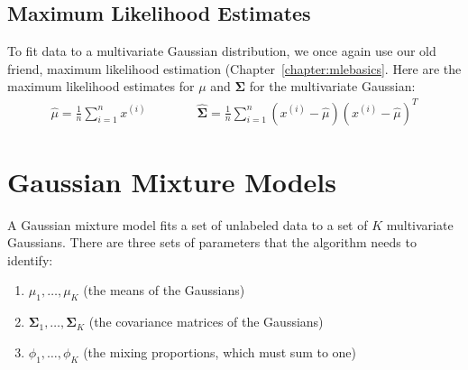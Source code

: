 \subsection{Maximum Likelihood Estimates}

To fit data to a multivariate Gaussian distribution, we once again use our old friend, maximum likelihood estimation (Chapter~\ref{chapter:mlebasics}. Here are the maximum likelihood estimates for $\mu$ and $\boldsymbol{\Sigma}$ for the multivariate Gaussian:
\begin{align*} {\hat{\mu} = \frac{1}{n} \sum_{i=1}^n x^{(i)}} \qquad\qquad \hat{\boldsymbol\Sigma} = \frac{1}{n} \sum_{i=1}^n (x^{(i)}-\hat{\mu})(x^{(i)}-\hat{\mu})^T \end{align*}


\section{Gaussian Mixture Models}

A Gaussian mixture model fits a set of unlabeled data to a set of $K$ multivariate Gaussians. There are three sets of parameters that the algorithm needs to identify:
\begin{enumerate}
\item $\mu_1, \dots, \mu_K$ (the means of the Gaussians)
\item $\boldsymbol\Sigma_1, \dots, \boldsymbol\Sigma_K$ (the covariance matrices of the Gaussians)
\item $\phi_1, \dots, \phi_K$ (the mixing proportions, which must sum to one)
\end{enumerate}

\vspace{1mm}

